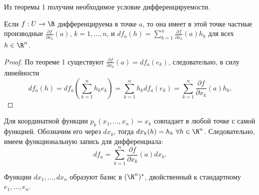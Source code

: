 Из теоремы 1 получим необходимое условие дифференцируемости.

\begin{corollary}
    Если $f: U \to \R$ дифференцируема в точке $a$, то она имеет в этой точке частные производные $\frac{\partial f}{\partial x_{k}}(a)$, $k = 1, \ldots, n$, и $df_{a}(h) = \sum_{k = 1}^{n}\frac{\partial f}{\partial x_{k}}(a)h_{k}$ для всех $h \in \R^{n}$.
\end{corollary}

\begin{proof}
    По теореме 1 существуют $\frac{\partial f}{\partial x_{k}}(a) = df_{a}(e_{k})$, следовательно, в силу линейности
    \[df_{a}(h) = df_{a}\left(\sum_{k = 1}^{n}h_{k}e_{k}\right) = \sum_{k = 1}^{n}h_{k}df_{a}(e_{k}) = \sum_{k = 1}^{n}\frac{\partial f}{\partial x_{k}}(a)h_{k}.\]
\end{proof}

\begin{note}
    Для координатной функции $p_{k}(x_{1}, \ldots, x_{n}) = x_{k}$ совпадает в любой точке с самой функцией. Обозначим его через $dx_{k}$, тогда $dx_{k}(h) = h_{k} \ \forall h \in \R^{n}$. Следовательно, имеем функциональную запись для дифференциала:
    \[df_{a} = \sum_{k = 1}^{n}\frac{\partial f}{\partial x_{k}}(a) d x_{k}.\]

    Функции $dx_{1}, \ldots, dx_{n}$ образуют базис в $(\R^{n})^{*}$, двойственный к стандартному $e_{1}, \ldots, e_{n}$.
\end{note}